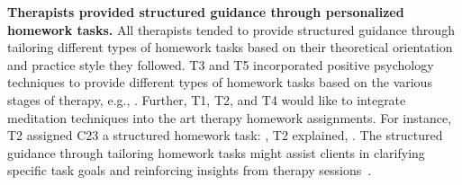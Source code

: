 \textbf{Therapists provided structured guidance through personalized homework tasks.} 
All therapists tended to provide structured guidance through tailoring different types of homework tasks based on their theoretical orientation and practice style they followed. 
T3 and T5 incorporated positive psychology techniques to provide different types of homework tasks based on the various stages of therapy, e.g., . 
Further, T1, T2, and T4 would like to integrate meditation techniques into the art therapy homework assignments. 
For instance, T2 assigned C23 a structured homework task: , T2 explained, .
The structured guidance through tailoring homework tasks might assist clients in clarifying specific task goals and reinforcing insights from therapy sessions~\cite{santisteban2003efficacy, tompkins2004using}.






